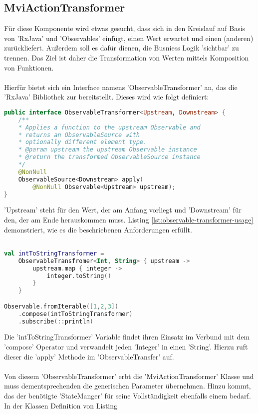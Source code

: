\subsection{MviActionTransformer}
Für diese Komponente wird etwas gesucht, dass sich in den Kreislauf auf Basis von 'RxJava' und 'Observables' einfügt, einen Wert erwartet und einen (anderen) zurückliefert. Außerdem soll es dafür dienen, die Busniess Logik 'sichtbar' zu trennen. Das Ziel ist daher die Transformation von Werten mittels Komposition von Funktionen.
\\\\
Hierfür bietet sich ein Interface namens 'ObservableTransformer' an, das die 'RxJava' Bibliothek zur bereitstellt. Dieses wird wie folgt definiert:
\begin{lstlisting}[caption={ObservableTransformer}, label={lst:observable-transformer}, language=Kotlin]
public interface ObservableTransformer<Upstream, Downstream> {
	/**
	* Applies a function to the upstream Observable and 
	* returns an ObservableSource with
	* optionally different element type.
	* @param upstream the upstream Observable instance
	* @return the transformed ObservableSource instance
	*/
	@NonNull
	ObservableSource<Downstream> apply(
		@NonNull Observable<Upstream> upstream);
}
\end{lstlisting}
'Upstream' steht für den Wert, der am Anfang vorliegt und 'Downstream' für den, der am Ende herauskommen muss. Listing
\ref{lst:observable-transformer-usage}
demonstriert, wie es die beschriebenen Anforderungen erfüllt.
\begin{lstlisting}[caption={ObservableTransformer Anwendung}, label={lst:observable-transformer-usage}, language=Kotlin]

val intToStringTransformer = 
	ObservableTransfromer<Int, String> { upstream ->
		upstream.map { integer ->
			integer.toString()
		}
	}

Observable.fromIterable([1,2,3])
	.compose(intToStringTransformer)
	.subscribe(::println)
\end{lstlisting}
\bigskip
Die 'intToStringTransformer' Variable findet ihren Einsatz im Verbund mit dem 'compose' Operator und verwandelt jeden 'Integer' in einen 'String'. Hierzu ruft dieser die 'apply' Methode im 'ObservableTransfer' auf.
\\\\
Von diesem 'ObservableTransformer' erbt die 'MviActionTransformer' Klasse und muss dementsprechenden die generischen Parameter übernehmen. Hinzu kommt, das der benötigte 'StateManger' für seine Vollständigkeit ebenfalls einem bedarf. In der Klassen Definition von Listing
